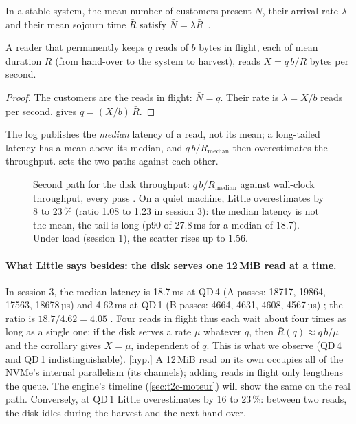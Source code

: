 \begin{theoreme}[Little, 1961]\label{thm:t2c-little}
In a stable system, the mean number of customers present $\bar N$, their arrival rate $\lambda$ and their mean sojourn time $\bar R$ satisfy $\bar N = \lambda \bar R$~\cite{little1961}.
\end{theoreme}

\begin{corollaire}\label{cor:t2c-little}
A reader that permanently keeps $q$ reads of $b$ bytes in flight, each of mean duration $\bar R$ (from hand-over to the system to harvest), reads $X = q\,b / \bar R$ bytes per second.
\end{corollaire}

\begin{proof}
The customers are the reads in flight: $\bar N = q$. Their rate is $\lambda = X/b$ reads per second.  gives $q = (X/b)\,\bar R$.
\end{proof}

The log publishes the \emph{median} latency of a read, not its mean; a long-tailed latency has a mean above its median, and $q\,b/R_{\mathrm{median}}$ then overestimates the throughput.  sets the two paths against each other.

\begin{figure}[ht]
\centering
\GrapheChmLittle
\caption[Little's law against the wall clock]{Second path for the disk throughput: $q\,b/R_{\mathrm{median}}$ against wall-clock throughput, every pass \mes. On a quiet machine, Little overestimates by 8 to 23\,\% (ratio 1.08 to 1.23 in session 3): the median latency is not the mean, the tail is long (p90 of 27.8\,ms for a median of 18.7). Under load (session 1), the scatter rises up to 1.56.}
\label{fig:t2c-little}
\end{figure}

\paragraph{What Little says besides: the disk serves one 12\,MiB read at a time.} In session 3, the median latency is 18.7\,ms at QD\,4 (A passes: \num{18717}, \num{19864}, \num{17563}, \num{18678}\,µs) and 4.62\,ms at QD\,1 (B passes: \num{4664}, \num{4631}, \num{4608}, \num{4567}\,µs) \mes; the ratio is $18.7 / 4.62 = 4.05$ \calc. Four reads in flight thus each wait about four times as long as a single one: if the disk serves a rate $\mu$ whatever $q$, then $\bar R(q) \approx q\,b/\mu$ and the corollary gives $X = \mu$, independent of $q$. This is what we observe (QD\,4 and QD\,1 indistinguishable). [hyp.] A 12\,MiB read on its own occupies all of the NVMe's internal parallelism (its channels); adding reads in flight only lengthens the queue. The engine's timeline (\cref{sec:t2c-moteur}) will show the same on the real path. Conversely, at QD\,1 Little overestimates by 16 to 23\,\%: between two reads, the disk idles during the harvest and the next hand-over.

